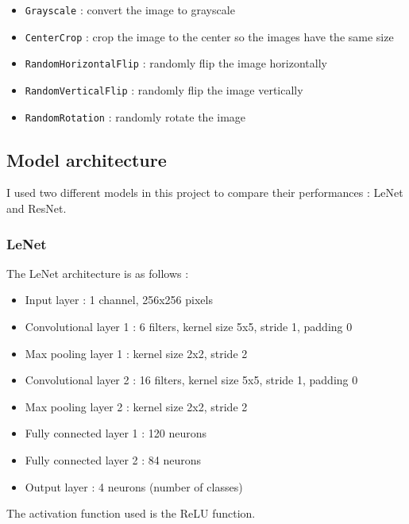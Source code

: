 \documentclass[12pt,a4paper]{article}
\begin{document}
\begin{itemize}
    \item \texttt{Grayscale} : convert the image to grayscale
    \item \texttt{CenterCrop} : crop the image to the center so the images have the same size
    \item \texttt{RandomHorizontalFlip} : randomly flip the image horizontally
    \item \texttt{RandomVerticalFlip} : randomly flip the image vertically
    \item \texttt{RandomRotation} : randomly rotate the image
\end{itemize}



\subsection{Model architecture}

I used two different models in this project to compare their performances : LeNet and ResNet.

\subsubsection{LeNet}

The LeNet architecture is as follows :

\begin{itemize}[label=-]
    \item Input layer : 1 channel, 256x256 pixels
    \item Convolutional layer 1 : 6 filters, kernel size 5x5, stride 1, padding 0
    \item Max pooling layer 1 : kernel size 2x2, stride 2
    \item Convolutional layer 2 : 16 filters, kernel size 5x5, stride 1, padding 0
    \item Max pooling layer 2 : kernel size 2x2, stride 2
    \item Fully connected layer 1 : 120 neurons
    \item Fully connected layer 2 : 84 neurons
    \item Output layer : 4 neurons (number of classes)
\end{itemize}

The activation function used is the ReLU function.
\end{document}
